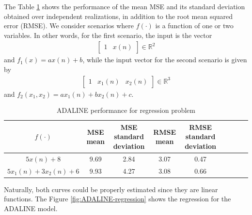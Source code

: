 \documentclass[12pt,a4paper]{article}
\newcommand{\Real}{\mathbb{R}}
\begin{document}
The Table \ref{tab:adaline-results} shows the performance of the mean MSE and its standard deviation obtained over independent realizations, in addition to the root mean squared error (RMSE). We consider scenarios where \(f(\cdot)\) is a function of one or two variables. In other words, for the first scenario, the input is the vector
\begin{align}
    \begin{bmatrix}
        1 & x(n)
    \end{bmatrix} \in \Real^2
\end{align}
and \(f_1(x) = ax(n)+b\), while the input vector for the second scenario is given by
\begin{align}
    \begin{bmatrix}
        1 & x_1(n) & x_2(n)
    \end{bmatrix} \in \Real^3
\end{align}
and \(f_2(x_1, x_2) = ax_1(n)+bx_2(n)+c\).

\begin{table}[H]
	\centering
	\caption{ADALINE performance for regression problem}
	\footnotesize
	\setlength{\tabcolsep}{5pt}
	\begin{tabular}{ccccccccc}
		\hline
		\(f(\cdot)\) & MSE mean & MSE standard deviation & RMSE mean & RMSE standard deviation \\
		\hline
		\(5x(n)+8\) & 9.69 & 2.84 & 3.07 & 0.47 \\
        \hline
		\(5x_1(n)+3x_2(n)+6\) & 9.93 & 4.27 & 3.08 & 0.66 \\
		\hline
	\end{tabular} \label{tab:adaline-results}
\end{table}

Naturally, both curves could be properly estimated since they are linear functions. The Figure \ref{fig:ADALINE-regression} shows the regression for the ADALINE model.
\end{document}
